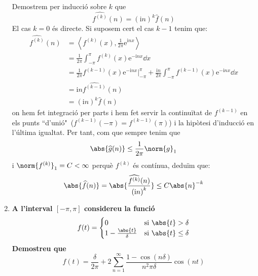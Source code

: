 \documentclass[10pt,a4paper]{article}
\newcommand{\ii}{\mathrm{i}} %
\theoremstyle{definition}
\renewcommand{\exp}[1]{\mathrm{e}^{#1}} %
\begin{document}
\begin{enumerate}
        Demostrem per inducció sobre $k$ que $$\widehat{f^{(k)}}(n)={(\ii n)}^k\widehat{f}(n)$$
        El cas $k=0$ és directe. Si suposem cert el cas $k-1$ tenim que:
        \begin{align*}
          \widehat{f^{(k)}}(n) & =\left\langle f^{(k)}(x),\frac{1}{2\pi}\exp{\ii nx}\right\rangle                                                               \\
                               & =\frac{1}{2\pi}\int_{-\pi}^\pi f^{(k)}(x)\exp{-\ii n x}\dd{x}                                                                  \\
                               & =\frac{1}{2\pi}f^{(k-1)}(x)\exp{-\ii n x}\Big|_{-\pi}^\pi + \frac{\ii n}{2\pi}\int_{-\pi}^\pi f^{(k-1)}(x)\exp{-\ii n x}\dd{x} \\
                               & =\ii n \widehat{f^{(k-1)}}(n)                                                                                                  \\
                               & ={(\ii n)}^k\widehat{f}(n)
        \end{align*}
        on hem fet integració per parts i hem fet servir la continuïtat de $f^{(k-1)}$ en els punts ``d'unió"\ ($f^{(k-1)}(-\pi)=f^{(k-1)}(\pi)$) i la hipòtesi d'inducció en l'última igualtat.
        Per tant, com que sempre tenim que $$\abs{\widehat{g}(n)}\leq\frac{1}{2\pi}\norm{g}_1$$ i $\norm{f^{(k)}}_1=C<\infty$ perquè $f^{(k)}$ és contínua, deduïm que:
        $$\abs{\widehat{f}(n)}=\abs{\frac{\widehat{f^{(k)}}(n)}{{(\ii n)}^k}}\leq C\abs{n}^{-k}$$
        \item\textbf{A l'interval $[-\pi, \pi]$ considereu la funció}
        \begin{equation*}
          f(t)=\begin{cases}

            0                        & \text{si } \abs{t}>\delta    \\
            1-\frac{\abs{t}}{\delta} & \text{si } \abs{t}\leq\delta
          \end{cases}
        \end{equation*}
        \textbf{Demostreu que $$f(t)=\frac{\delta}{2\pi}+2\sum_{n=1}^\infty\frac{1-\cos(n\delta)}{n^2\pi\delta}\cos(nt)$$}


\end{enumerate}
\end{document}
